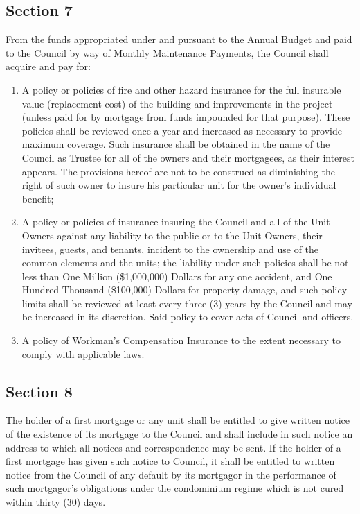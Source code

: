 \documentclass[
]{book}
\begin{document}
\hypertarget{section-7-3}{%
\subsection*{Section 7}\label{section-7-3}}

From the funds appropriated under and pursuant to the Annual Budget and paid to the Council by way of Monthly Maintenance Payments, the Council shall acquire and pay for:

\begin{enumerate}
\def\labelenumi{(\alph{enumi})}
\item
  A policy or policies of fire and other hazard insurance for the full insurable value (replacement cost) of the building and improvements in the project (unless paid for by mortgage from funds impounded for that purpose). These policies shall be reviewed once a year and increased as necessary to provide maximum coverage. Such insurance shall be obtained in the name of the Council as Trustee for all of the owners and their mortgagees, as their interest appears. The provisions hereof are not to be construed as diminishing the right of such owner to insure his particular unit for the owner's individual benefit;
\item
  A policy or policies of insurance insuring the Council and all of the Unit Owners against any liability to the public or to the Unit Owners, their invitees, guests, and tenants, incident to the ownership and use of the common elements and the units; the liability under such policies shall be not less than One Million (\$1,000,000) Dollars for any one accident, and One Hundred Thousand (\$100,000) Dollars for property damage, and such policy limits shall be reviewed at least every three (3) years by the Council and may be increased in its discretion. Said policy to cover acts of Council and officers.
\item
  A policy of Workman's Compensation Insurance to the extent necessary to comply with applicable laws.
\end{enumerate}

\hypertarget{section-8-3}{%
\subsection*{Section 8}\label{section-8-3}}

The holder of a first mortgage or any unit shall be entitled to give written notice of the existence of its mortgage to the Council and shall include in such notice an address to which all notices and correspondence may be sent. If the holder of a first mortgage has given such notice to Council, it shall be entitled to written notice from the Council of any default by its mortgagor in the performance of such mortgagor's obligations under the condominium regime which is not cured within thirty (30) days.
\end{document}
